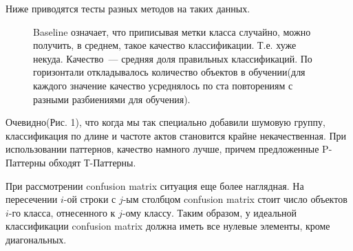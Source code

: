 \documentclass[12pt]{report}
\begin{document}
Ниже приводятся тесты разных методов 
на таких данных. 

\begin{figure}[h]
\label{fig:nosy}
\noindent{}
\caption{ Baseline означает, что приписывая метки класса случайно, можно получить, в среднем, такое качество классификации. Т.е. хуже некуда. 
Качество~--- средняя доля правильных классификаций.
По горизонтали откладывалось количество объектов в обучении(для каждого значение качество усреднялось по ста повторениям с разными разбиениями для обучения). }
\end{figure}
Очевидно(Рис. 1), что когда мы так специально добавили шумовую группу, классификация по длине и частоте актов становится крайне некачественная. 
При использовании паттернов, качество намного лучше, причем предложенные P-Паттерны обходят Т-Паттерны.

При рассмотрении confusion matrix ситуация еще более наглядная. На пересечении $i$-ой строки с
$j$-ым столбцом confusion matrix стоит число объектов $i$-го класса, отнесенного к $j$-ому классу. Таким образом,
у идеальной классификации confusion matrix должна иметь все нулевые элементы, кроме диагональных.
\end{document}
